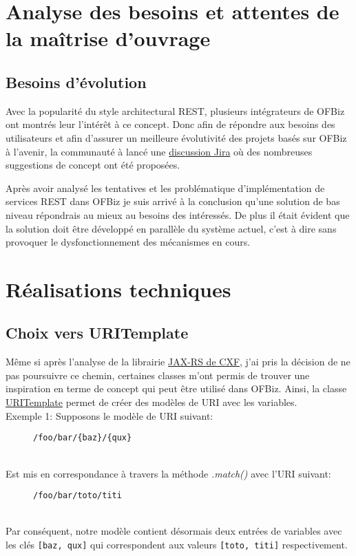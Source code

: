 \section{Analyse des besoins et attentes de la maîtrise d'ouvrage}
\subsection{Besoins d'évolution}
Avec la popularité du style architectural REST, plusieurs intégrateurs de OFBiz ont montrés leur l'intérêt à ce concept. 
Donc afin de répondre aux besoins des utilisateurs et afin d'assurer un meilleure évolutivité des projets basés sur OFBiz à l'avenir, la communauté à lancé une  \href{https://issues.apache.org/jira/browse/OFBIZ-4274}{discussion Jira} où des nombreuses suggestions de concept ont été proposées. 

Après avoir analysé les tentatives et les problématique d'implémentation de services REST dans OFBiz je suis arrivé à la conclusion qu'une solution de bas niveau répondrais au mieux au besoins des intéressés. De plus il était évident que la solution doit être développé en parallèle du système actuel, c'est à dire sans provoquer le dysfonctionnement des mécanismes en cours. 




\section{Réalisations techniques}
\subsection{Choix vers URITemplate}
Même si après l'analyse de la librairie \href{http://cxf.apache.org/docs/jax-rs.html}{JAX-RS de CXF}, j'ai pris la décision de ne pas poursuivre ce chemin, certaines classes m'ont permis de trouver une inspiration en terme de concept qui peut être utilisé dans OFBiz. Ainsi, la classe \href{https://cxf.apache.org/javadoc/latest/org/apache/cxf/jaxrs/model/URITemplate.html}{URITemplate}  permet de créer des modèles de URI avec les variables. \\
Exemple 1: 
Supposons le modèle de URI suivant:
\begin{figure}[h!]
	\begin{lstlisting}[frame=leftline]
/foo/bar/{baz}/{qux}
	\end{lstlisting}
\end{figure}
\\Est mis en correspondance à travers la méthode \emph{.match()} avec l'URI suivant:
\begin{figure}[h!]
	\begin{lstlisting}[frame=leftline]
/foo/bar/toto/titi
	\end{lstlisting}
\end{figure}\\
Par conséquent, notre modèle contient désormais deux entrées de variables avec les clés \verb|[baz, qux]| qui correspondent aux valeurs \verb|[toto, titi]| respectivement. 

